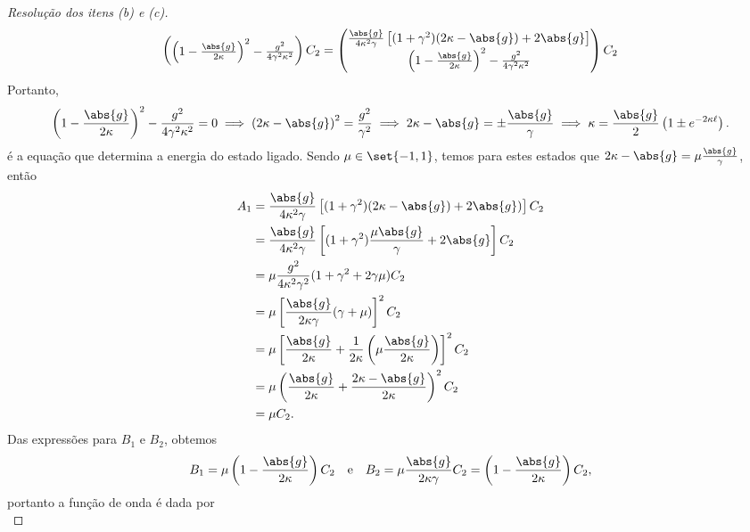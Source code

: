 \begin{proof}[Resolução dos itens (b) e (c)]
\begin{equation*}
\begin{pmatrix}
            \left(1 - \frac{\abs{g}}{2 \kappa}\right)^2 - \frac{g^2}{4 \gamma^2 \kappa^2}
        \end{pmatrix}
        C_2 =
        \begin{pmatrix}
            \frac{\abs{g}}{4 \kappa^2 \gamma}\left[(1+\gamma^2)(2 \kappa - \abs{g}) + 2 \abs{g} \right]\\
            \left(1 - \frac{\abs{g}}{2 \kappa}\right)^2 - \frac{g^2}{4 \gamma^2 \kappa^2}
        \end{pmatrix}C_2
    \end{equation*}
    Portanto,
    \begin{equation*}
        \left(1 - \frac{\abs{g}}{2 \kappa}\right)^2 - \frac{g^2}{4 \gamma^2 \kappa^2} = 0 \implies \left(2\kappa - \abs{g}\right)^2 = \frac{g^2}{\gamma^2} \implies 2 \kappa - \abs{g} = \pm \frac{\abs{g}}{\gamma} \implies \kappa = \frac{\abs{g}}{2}\left(1 \pm e^{-2 \kappa \ell}\right).
    \end{equation*}
    é a equação que determina a energia do estado ligado. Sendo \(\mu \in \set{-1,1}\), temos para estes estados que \(2\kappa - \abs{g} = \mu \frac{\abs{g}}{\gamma}\), então
    \begin{align*}
        A_1 &= \frac{\abs{g}}{4 \kappa^2 \gamma} \left[(1 + \gamma^2)(2 \kappa - \abs{g}) + 2\abs{g})\right]C_2\\
            &= \frac{\abs{g}}{4 \kappa^2 \gamma} \left[(1 + \gamma^2)\frac{\mu\abs{g}}{\gamma} + 2\abs{g}\right]C_2\\
            &= \mu\frac{g^2}{4\kappa^2 \gamma^2}(1 + \gamma^2 + 2 \gamma \mu)C_2\\
            &= \mu\left[\frac{\abs{g}}{2 \kappa \gamma}(\gamma + \mu)\right]^2C_2\\
            &= \mu\left[\frac{\abs{g}}{2\kappa} + \frac{1}{2\kappa}\left(\mu\frac{\abs{g}}{2 \kappa}\right)\right]^2 C_2\\
            &= \mu \left(\frac{\abs{g}}{2 \kappa} + \frac{2\kappa - \abs{g}}{2\kappa}\right)^2 C_2\\
            &= \mu C_2.
    \end{align*}
    Das expressões para \(B_1\) e \(B_2\), obtemos
    \begin{equation*}
        B_1 = \mu\left(1 - \frac{\abs{g}}{2\kappa}\right)C_2\quad\text{e}\quad B_2 = \mu\frac{\abs{g}}{2\kappa \gamma}C_2 = \left(1 - \frac{\abs{g}}{2\kappa}\right)C_2,
    \end{equation*}
    portanto a função de onda é dada por
    \begin{equation*}

\end{equation*}
\end{proof}
